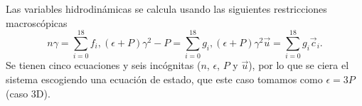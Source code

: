 \documentclass{article}
\begin{document}
Las variables hidrodinámicas se calcula usando las siguientes restricciones macroscópicas
\begin{subequations}
\begin{equation}
    n\gamma = \sum_{i=0}^{18} f_i, 
\end{equation}
\begin{equation}
    (\epsilon+P) \gamma^2-P = \sum_{i=0}^{18} g_i, 
\end{equation}
\begin{equation}
    (\epsilon+P) \gamma^2 \vec{u} = \sum_{i=0}^{18} g_i \vec{c}_i. 
\end{equation}
\end{subequations}
Se tienen cinco ecuaciones y seis incógnitas ($n$, $\epsilon$, $P$ y $\vec{u}$), por lo que se ciera el sistema escogiendo una ecuación de estado, que este caso tomamos como $\epsilon= 3P$ (caso 3D).\\
    
\end{document}
